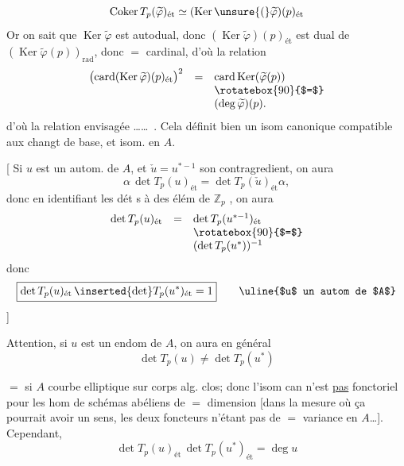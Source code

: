 
\[
\operatorname{Coker}T_p(\widetilde\varphi)_{\text{ét}}\simeq(\operatorname{Ker}\unsure{(}\widetilde\varphi)(p)_{\text{ét}}
\]
Or on sait que $\operatorname{Ker}\widetilde\varphi$ est autodual, donc $(\operatorname{Ker}\widetilde\varphi)(p)_{\text{ét}}$ est dual de $(\operatorname{Ker}\widetilde\varphi(p))_{\mathrm{rad}}$, donc $=$ cardinal, d'où la relation
\[
\begin{array}{rcl}
\bigl(\operatorname{card}(\operatorname{Ker}\widetilde\varphi)(p)_{\text{ét}}\bigr)^2&=&\operatorname{card}\operatorname{Ker}(\widetilde\varphi(p))\\
&&\rotatebox{90}{$=$}\\
&& (\deg\widetilde\varphi)(p).
\end{array}
\]
d'où la relation envisagée \ldots\ldots\ . Cela définit bien un isom canonique
compatible aux changt de base, et isom. en $A$.

[ Si $u$ est un autom. de $A$, et $\check u=u^{*-1}$ son contragredient, on aura
\[
\alpha\,\det T_p(u)_{\text{ét}}=\det T_p(\check u)_{\text{ét}}\alpha,
\]
donc en identifiant les dét s à des élém de $\mathbb Z_p$ , on aura
\[
\begin{array}{rcl}
\det T_p(u)_{\text{ét}}&=&\det T_p(u^{*-1})_{\text{ét}}\\
&&\rotatebox{90}{$=$}\\
&& (\det T_p(u^*))^{-1}
\end{array}
\]
donc
\[
\boxed{\det T_p(u)_{\text{ét}}\,\inserted{\det}T_p(u^*)_{\text{ét}}=1}\qquad\text{\uline{$u$ un autom de $A$}}
\]
]

Attention, si $u$ est un endom de $A$, on aura en général
\[
\det T_p(u)\ne\det T_p(u^*)
\]

$=$ si $A$ courbe elliptique sur corps alg. clos; donc l'isom can n'est \uline{pas} fonctoriel pour les hom de schémas abéliens de $=$ dimension [dans la mesure où ça pourrait avoir un sens, les deux foncteurs n'étant pas de $=$ variance en $A$\ldots]. Cependant, 
\[
\boxed{\det T_p(u)_{\text{ét}}\,\det T_p(u^*)_{\text{ét}}=\deg u}
\]

